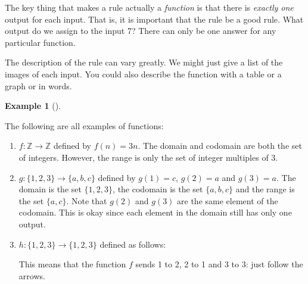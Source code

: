 \documentclass[10pt,]{book}
\theoremstyle{plain}
\theoremstyle{definition}
\newtheorem{example}[theorem]{Example}
\theoremstyle{definition}
\theoremstyle{definition}
\numberwithin{equation}{chapter}
\def\Z{\mathbb Z}
\begin{document}
      The key thing that makes a rule actually a \emph{function} is that there is \emph{exactly one} output for each input. That is, it is important that the rule be a good rule. What output do we assign to the input 7? There can only be one answer for any particular function.
\par

      The description of the rule can vary greatly. We might just give a list of the images of each input. You could also describe the function with a table or a graph or in words.
\begin{example}[]\label{example-16}

          The following are all examples of functions:

          \leavevmode%
\begin{enumerate}
\item\hypertarget{li-276}{}\(f:\Z \to \Z\) defined by \(f(n) = 3n\). The domain and codomain are both the set of integers. However, the range is only the set of integer multiples of 3.%
\item\hypertarget{li-277}{}\(g: \{1,2,3\} \to \{a,b,c\}\) defined by \(g(1) = c\), \(g(2) = a\) and \(g(3) = a\). The domain is the set \(\{1,2,3\}\), the codomain is the set \(\{a,b,c\}\) and the range is the set \(\{a,c\}\). Note that \(g(2)\) and \(g(3)\) are the same element of the codomain. This is okay since each element in the domain still has only one output.%
\item\hypertarget{li-278}{}\(h:\{1,2,3\} \to \{1,2,3\}\) defined as follows:

                \leavevmode%
\begin{figure}
\centering
{
}
\end{figure}

                This means that the function \(f\) sends 1 to 2, 2 to 1 and 3 to 3: just follow the arrows.

\end{enumerate}

\end{example}
\par
\end{document}
